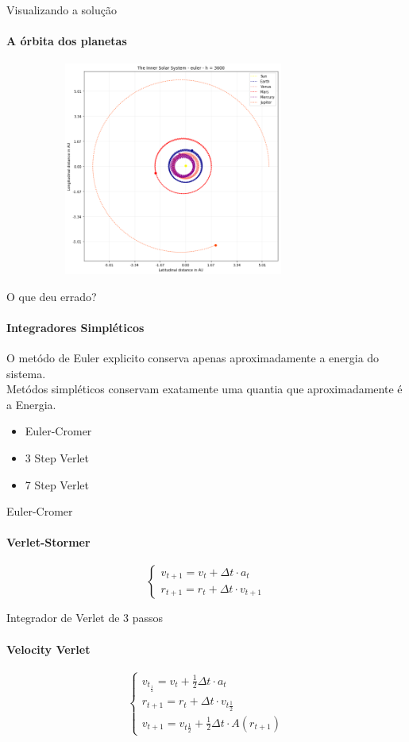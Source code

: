 \documentclass{beamer}
\begin{document}
    \begin{frame}{Visualizando a solução}
      \framesubtitle{A órbita dos planetas}%
      \begin{figure}[h]
        \includegraphics[width=90mm, height = 70mm]{resources/euler-3600-orbit.png}
      \end{figure}
    \end{frame}

    \begin{frame}{O que deu errado?}
      \framesubtitle{Integradores Simpléticos}%
      O metódo de Euler explicito conserva apenas aproximadamente a energia do sistema.\\
      Metódos simpléticos conservam exatamente uma quantia que aproximadamente é a Energia.\\
      \caption{Leapfrog Integrators}
      \begin{itemize}
        \item Euler-Cromer
        \item 3 Step Verlet
        \item 7 Step Verlet
      \end{itemize}
    \end{frame}

    \begin{frame}{Euler-Cromer}
      \framesubtitle{Verlet-Stormer}%
      \[
      \begin{cases}
        v_{t+1} = v_{t} + \Delta t \cdot a_t\\
        r_{t+1} = r_{t} + \Delta t \cdot v_{t+1}
      \end{cases}
      \]
    \end{frame}

    \begin{frame}{Integrador de Verlet de 3 passos}
      \framesubtitle{Velocity Verlet}%
      \[
      \begin{cases}
        v_{t_\frac{1}{2}} = v_t + \frac{1}{2} \Delta t \cdot a_t  \\
        r_{t+1} = r_t + \Delta t \cdot v_{t\frac{1}{2}} \\
        v_{t+1} = v_{t\frac{1}{2}} + \frac{1}{2}\Delta t\cdot A(r_{t+1})
      \end{cases}
      \]
    \end{frame}
\end{document}
